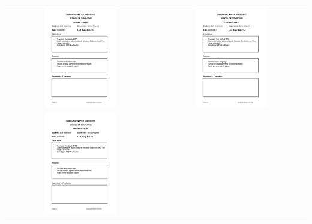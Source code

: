 \documentclass[12pt,a4paper]{article}
\begin{document}
\begin{appendices}
\begin{longtable}{@{}cc@{}}
\includegraphics[page=13, width=0.5\textwidth]{figures/diaries} &
\includegraphics[page=14, width=0.5\textwidth]{figures/diaries} \\
\includegraphics[page=15, width=0.5\textwidth]{figures/diaries} &

\end{longtable}
\end{appendices}
\end{document}
